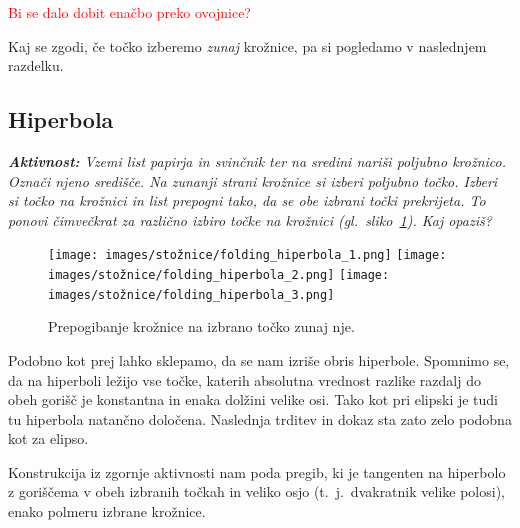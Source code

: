 \textcolor{red}{Bi se dalo dobit enačbo preko ovojnice?}

Kaj se zgodi, če točko izberemo \emph{zunaj} krožnice, pa si pogledamo v naslednjem razdelku.

\subsection{Hiperbola}

\textit{\textbf{Aktivnost:} Vzemi list papirja in svinčnik ter na sredini nariši poljubno krožnico. Označi njeno središče. Na zunanji strani krožnice si izberi poljubno točko. Izberi si točko na krožnici in list prepogni tako, da se obe izbrani točki prekrijeta. To ponovi čimvečkrat za različno izbiro točke na krožnici (gl.\ sliko~\ref{fig:koraki_hiperbola}). Kaj opaziš?}

\begin{figure}[h]
    \centering
    \texttt{[image: images/stožnice/folding\_hiperbola\_1.png]}
    \texttt{[image: images/stožnice/folding\_hiperbola\_2.png]}
    \texttt{[image: images/stožnice/folding\_hiperbola\_3.png]}
    \caption[Prepogibanje hiperbole]{Prepogibanje krožnice na izbrano točko zunaj nje.}
    \label{fig:koraki_hiperbola}
\end{figure}

Podobno kot prej lahko sklepamo, da se nam izriše obris hiperbole. Spomnimo se, da na hiperboli ležijo vse točke, katerih absolutna vrednost razlike razdalj do obeh gorišč je konstantna in enaka dolžini velike osi. Tako kot pri elipski je tudi tu hiperbola natančno določena. Naslednja trditev in dokaz sta zato zelo podobna kot za elipso.

\begin{trditev}
    Konstrukcija iz zgornje aktivnosti nam poda pregib, ki je tangenten na hiperbolo z goriščema v obeh izbranih točkah in veliko osjo (t.\ j.\ dvakratnik velike polosi), enako polmeru izbrane krožnice.
\end{trditev}

